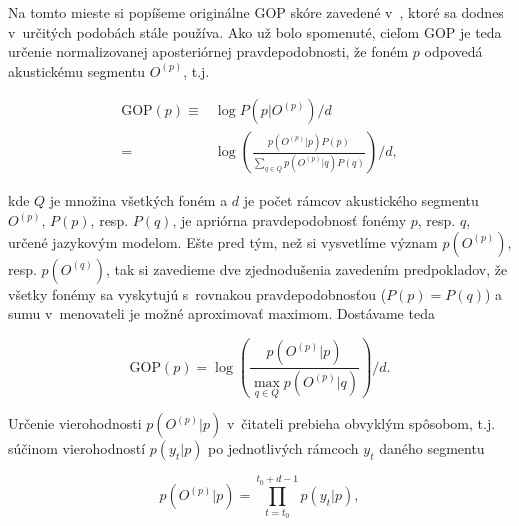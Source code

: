 Na tomto mieste si popíšeme originálne GOP skóre zavedené v~\cite{Witt2000}, ktoré sa dodnes v~určitých podobách stále používa. 
Ako už bolo spomenuté, cieľom GOP je teda určenie normalizovanej aposteriórnej pravdepodobnosti, že foném $p$ odpovedá akustickému segmentu $O^{(p)}$, t.j. 


\begin{align}
    \text{GOP}(p) \equiv&  \log P(p | O^{(p)})  / d \\
                  =& \log \left( \frac{p(O^{(p)} | p) P(p)}{\sum_{q \in Q} p(O^{(p)} | q) P(q)} \right) \bigg/ d \label{eq:gop1},
\end{align}

\noindent kde $Q$ je množina všetkých foném a $d$ je počet rámcov
akustického segmentu $O^{(p)}$, $P(p)$, resp. $P(q)$, je apriórna pravdepodobnosť fonémy $p$, resp. $q$, určené jazykovým modelom. Ešte pred tým, než si vysvetlíme význam $p(O^{(p)})$, resp. $p(O^{(q)})$, tak si zavedieme dve zjednodušenia zavedením predpokladov, že všetky fonémy sa vyskytujú s~rovnakou pravdepodobnosťou ($P(p) = P(q)$) a sumu v~menovateli je možné aproximovať maximom. Dostávame teda


\begin{equation} \label{eq:gop2}
    \text{GOP}(p) = \log \left( \frac{p(O^{(p)} | p)}{\max_{q \in Q} p(O^{(p)} | q)} \right) \bigg/ d.
\end{equation}

\noindent Určenie vierohodnosti $p(O^{(p)}|p)$ v~čitateli prebieha obvyklým spôsobom, t.j. súčinom vierohodností $p(y_t | p)$ po jednotlivých rámcoch $y_t$ daného segmentu 

\begin{equation}
p(O^{(p)} | p) = \prod_{t=t_0}^{t_0+d-1} p(y_t | p),
\end{equation}

